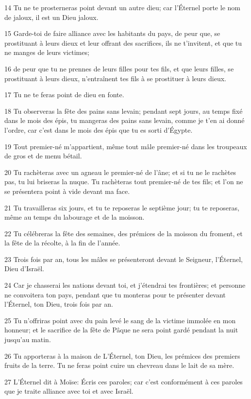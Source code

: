 \par 14 Tu ne te prosterneras point devant un autre dieu; car l'Éternel porte le nom de jaloux, il est un Dieu jaloux.
\par 15 Garde-toi de faire alliance avec les habitants du pays, de peur que, se prostituant à leurs dieux et leur offrant des sacrifices, ils ne t'invitent, et que tu ne manges de leurs victimes;
\par 16 de peur que tu ne prennes de leurs filles pour tes fils, et que leurs filles, se prostituant à leurs dieux, n'entraînent tes fils à se prostituer à leurs dieux.
\par 17 Tu ne te feras point de dieu en fonte.
\par 18 Tu observeras la fête des pains sans levain; pendant sept jours, au temps fixé dans le mois des épis, tu mangeras des pains sans levain, comme je t'en ai donné l'ordre, car c'est dans le mois des épis que tu es sorti d'Égypte.
\par 19 Tout premier-né m'appartient, même tout mâle premier-né dans les troupeaux de gros et de menu bétail.
\par 20 Tu rachèteras avec un agneau le premier-né de l'âne; et si tu ne le rachètes pas, tu lui briseras la nuque. Tu rachèteras tout premier-né de tes fils; et l'on ne se présentera point à vide devant ma face.
\par 21 Tu travailleras six jours, et tu te reposeras le septième jour; tu te reposeras, même au temps du labourage et de la moisson.
\par 22 Tu célébreras la fête des semaines, des prémices de la moisson du froment, et la fête de la récolte, à la fin de l'année.
\par 23 Trois fois par an, tous les mâles se présenteront devant le Seigneur, l'Éternel, Dieu d'Israël.
\par 24 Car je chasserai les nations devant toi, et j'étendrai tes frontières; et personne ne convoitera ton pays, pendant que tu monteras pour te présenter devant l'Éternel, ton Dieu, trois fois par an.
\par 25 Tu n'offriras point avec du pain levé le sang de la victime immolée en mon honneur; et le sacrifice de la fête de Pâque ne sera point gardé pendant la nuit jusqu'au matin.
\par 26 Tu apporteras à la maison de L'Éternel, ton Dieu, les prémices des premiers fruits de la terre. Tu ne feras point cuire un chevreau dans le lait de sa mère.
\par 27 L'Éternel dit à Moïse: Écris ces paroles; car c'est conformément à ces paroles que je traite alliance avec toi et avec Israël.
